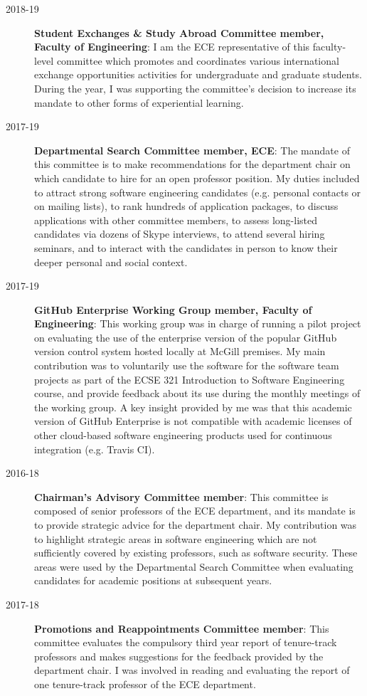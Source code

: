 \begin{description}
\item[2018-19] \textbf{Student Exchanges \& Study Abroad Committee member, Faculty of Engineering}: I am the ECE representative of this faculty-level committee which promotes and coordinates various international exchange opportunities activities for undergraduate and graduate students. During the year, I was supporting the committee's decision to increase its mandate to other forms of experiential learning. 
\item[2017-19] \textbf{Departmental Search Committee member, ECE}: The mandate of this committee is to make recommendations for the department chair on which candidate to hire for an open professor position. My duties included to attract strong software engineering candidates (e.g. personal contacts or on mailing lists), to rank hundreds of application packages, to discuss applications with other committee members, to assess long-listed candidates via dozens of Skype interviews, to attend several hiring seminars, and to interact with the candidates in person to know their deeper personal and social context.
\item[2017-19] \textbf{GitHub Enterprise Working Group member, Faculty of Engineering}: This working group was in charge of running a pilot project on evaluating the use of the enterprise version of the popular GitHub version control system hosted locally at McGill premises. My main contribution was to voluntarily use the software for the software team projects as part of the ECSE 321 Introduction to Software Engineering course, and provide feedback about its use during the monthly meetings of the working group. A key insight provided by me was that this academic version of GitHub Enterprise is not compatible with academic licenses of other cloud-based software engineering products used for continuous integration (e.g. Travis CI).
\item[2016-18] \textbf{Chairman's Advisory Committee member}: This committee is composed of senior professors of the ECE department, and its mandate is to provide strategic advice for the department chair. My contribution was to highlight strategic areas in software engineering which are not sufficiently covered by existing professors, such as software security. These areas were used by the Departmental Search Committee when evaluating candidates for academic positions at subsequent years.
\item[2017-18] \textbf{Promotions and Reappointments Committee member}: This committee evaluates the compulsory third year report of tenure-track professors and makes suggestions for the feedback provided by the department chair. I was involved in reading and evaluating the report of one tenure-track professor of the ECE department. 

\end{description}
